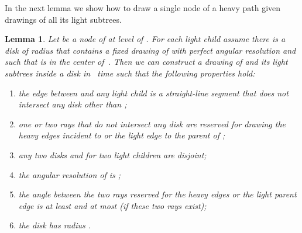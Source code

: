 \documentclass[11pt]{article}
\newtheorem{lemma}{Lemma}
\begin{document}
In the next lemma we show how to draw a single node  of a heavy
path  given drawings of all its light subtrees.
\begin{lemma}\label{lem:heavynode:straight}
  Let  be a node of  at level  of . For each light child 
  assume there is a disk  of radius  that contains a fixed drawing of  with perfect angular
  resolution and such that  is in the center of~. Then we can
  construct a drawing of  and its light subtrees inside a disk  in~ time such that the following properties hold:
  \begin{enumerate}
  \item\label{dsle:item:edge} the edge between  and any light child  is a straight-line segment that does not intersect any
    disk other than ;
  \item\label{dsle:item:heavyedge} one or two rays that do not intersect any disk  are reserved for drawing the heavy edges incident to  or the light edge to the parent of ;
  \item\label{dsle:item:disks} any two disks  and  for two light children  are disjoint;
  \item\label{dsle:item:angres} the angular resolution of  is ;
  \item\label{dsle:item:angle} the angle between the two rays reserved for the heavy edges or the light parent edge is at least
     and at most  (if these two rays exist);
  \item\label{dsle:item:area} the disk  has radius .
  \end{enumerate}
\end{lemma}
\end{document}
